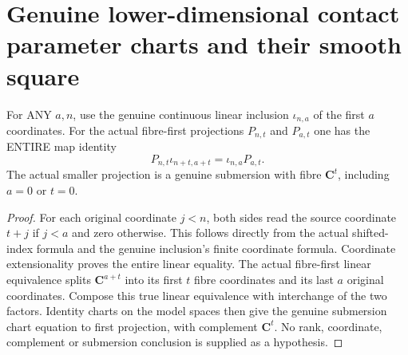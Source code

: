 \section{Genuine lower-dimensional contact parameter charts and their smooth square}

\begin{lemma}
\label{hir:submersion-contact-parameters-linear-plane-square}
\leanok
For ANY $a,n$, use the genuine continuous linear inclusion $\iota_{n,a}$
of the first $a$ coordinates. For the actual fibre-first projections $P_{n,t}$
and $P_{a,t}$ one has the ENTIRE map identity
\[P_{n,t}\iota_{n+t,a+t}=\iota_{n,a}P_{a,t}.\]
The actual smaller projection is a genuine submersion with fibre $\mathbf C^t$,
including $a=0$ or $t=0$.
\end{lemma}
\begin{proof}
For each original coordinate $j<n$, both sides read the source coordinate
$t+j$ if $j<a$ and zero otherwise. This follows directly from the actual
shifted-index formula and the genuine inclusion's finite coordinate formula.
Coordinate extensionality proves the entire linear equality. The actual
fibre-first linear equivalence splits $\mathbf C^{a+t}$ into its first $t$
fibre coordinates and its last $a$ original coordinates. Compose this true
linear equivalence with interchange of the two factors. Identity charts on
the model spaces then give the genuine submersion chart equation to first
projection, with complement $\mathbf C^t$. No rank, coordinate, complement
or submersion conclusion is supplied as a hypothesis.
\end{proof}

